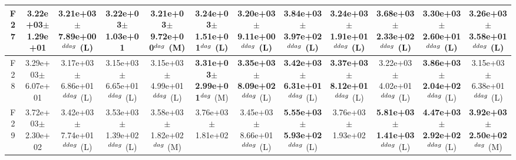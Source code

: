 \begin{table}[!t]
\begin{tabular}{c|ccccccccccc}
F27  & 3.22e+03$\pm$1.29e+01  & 3.21e+03$\pm$7.89e+00$^{\\ddag}$ (L)  & 3.22e+03$\pm$1.03e+01   & 3.21e+03$\pm$9.72e+00$^{\\dag}$ (M)  & \textbf{3.24e+03$\pm$1.51e+01}$^{\\dag}$ (L)  & 3.20e+03$\pm$9.11e+00$^{\\ddag}$ (L)  & \textbf{3.84e+03$\pm$3.97e+02}$^{\\ddag}$ (L)  & \textbf{3.24e+03$\pm$1.91e+01}$^{\\ddag}$ (L)  & \textbf{3.68e+03$\pm$2.33e+02}$^{\\ddag}$ (L)  & \textbf{3.30e+03$\pm$2.60e+01}$^{\\ddag}$ (L)  & \textbf{3.26e+03$\pm$3.58e+01}$^{\\ddag}$ (L) \\ \hline
F28  & 3.29e+03$\pm$6.07e+01  & 3.17e+03$\pm$6.86e+01$^{\\ddag}$ (L)  & 3.15e+03$\pm$6.65e+01$^{\\ddag}$ (L)  & 3.15e+03$\pm$4.99e+01$^{\\ddag}$ (L)  & \textbf{3.31e+03$\pm$2.99e+01}$^{\\dag}$ (M)  & \textbf{3.35e+03$\pm$8.09e+02}$^{\\ddag}$ (L)  & \textbf{3.42e+03$\pm$6.31e+01}$^{\\ddag}$ (L)  & \textbf{3.37e+03$\pm$8.12e+01}$^{\\ddag}$ (L)  & 3.22e+03$\pm$4.02e+01$^{\\ddag}$ (L)  & \textbf{3.86e+03$\pm$2.04e+02}$^{\\ddag}$ (L)  & 3.15e+03$\pm$6.38e+01$^{\\ddag}$ (L) \\ \hline
F29  & 3.72e+03$\pm$2.30e+02  & 3.42e+03$\pm$7.74e+01$^{\\ddag}$ (L)  & 3.53e+03$\pm$1.39e+02$^{\\ddag}$ (L)  & 3.58e+03$\pm$1.82e+02$^{\\dag}$ (M)  & 3.76e+03$\pm$1.81e+02   & 3.45e+03$\pm$8.66e+01$^{\\ddag}$ (L)  & \textbf{5.55e+03$\pm$5.93e+02}$^{\\ddag}$ (L)  & 3.76e+03$\pm$1.93e+02   & \textbf{5.81e+03$\pm$1.41e+03}$^{\\ddag}$ (L)  & \textbf{4.47e+03$\pm$2.92e+02}$^{\\ddag}$ (L)  & \textbf{3.92e+03$\pm$2.50e+02}$^{\\dag}$ (M) \\ \hline
\end{tabular}
\end{table}
